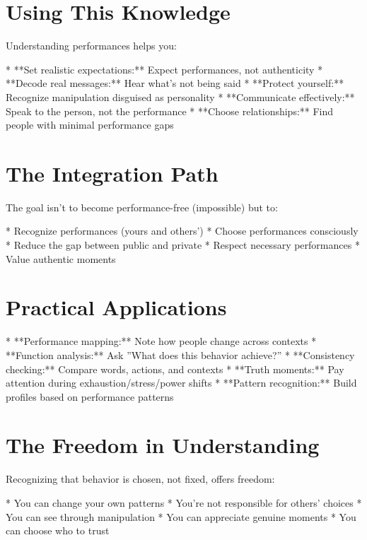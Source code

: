 \documentclass[12pt,oneside]{book}
\begin{document}
\section{Using This Knowledge}

Understanding performances helps you:

                    * **Set realistic expectations:** Expect performances, not authenticity
                    * **Decode real messages:** Hear what's not being said
                    * **Protect yourself:** Recognize manipulation disguised as personality
                    * **Communicate effectively:** Speak to the person, not the performance
                    * **Choose relationships:** Find people with minimal performance gaps

\section{The Integration Path}

The goal isn't to become performance-free (impossible) but to:

                    * Recognize performances (yours and others')
                    * Choose performances consciously
                    * Reduce the gap between public and private
                    * Respect necessary performances
                    * Value authentic moments

\section{Practical Applications}

                    * **Performance mapping:** Note how people change across contexts
                    * **Function analysis:** Ask ''What does this behavior achieve?''
                    * **Consistency checking:** Compare words, actions, and contexts
                    * **Truth moments:** Pay attention during exhaustion/stress/power shifts
                    * **Pattern recognition:** Build profiles based on performance patterns

\section{The Freedom in Understanding}

Recognizing that behavior is chosen, not fixed, offers freedom:

                    * You can change your own patterns
                    * You're not responsible for others' choices
                    * You can see through manipulation
                    * You can appreciate genuine moments
                    * You can choose who to trust
\end{document}
